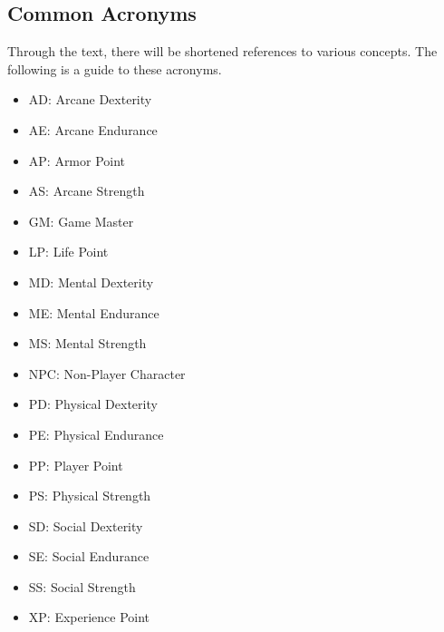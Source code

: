 \begin{multicols}{2}
\section{Common Acronyms}

Through the text, there will be shortened references to various concepts.
The following is a guide to these acronyms.

\begin{itemize}
  \item AD: Arcane Dexterity
  \item AE: Arcane Endurance
  \item AP: Armor Point
  \item AS: Arcane Strength
  \item GM: Game Master
  \item LP: Life Point
  \item MD: Mental Dexterity
  \item ME: Mental Endurance
  \item MS: Mental Strength
  \item NPC: Non-Player Character
  \item PD: Physical Dexterity
  \item PE: Physical Endurance
  \item PP: Player Point
  \item PS: Physical Strength
  \item SD: Social Dexterity
  \item SE: Social Endurance
  \item SS: Social Strength
  \item XP: Experience Point
\end{itemize}

\end{multicols}
